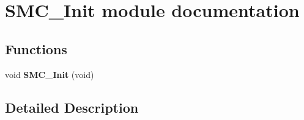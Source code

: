 \hypertarget{group___s_m_c___init__module}{}\section{S\+M\+C\+\_\+\+Init module documentation}
\label{group___s_m_c___init__module}
\subsection*{Functions}
\begin{DoxyCompactItemize}
\item 
void {\bfseries S\+M\+C\+\_\+\+Init} (void)\hypertarget{group___s_m_c___init__module_gaa7690259c56616104edd2c73b9397231}{}\label{group___s_m_c___init__module_gaa7690259c56616104edd2c73b9397231}

\end{DoxyCompactItemize}


\subsection{Detailed Description}
